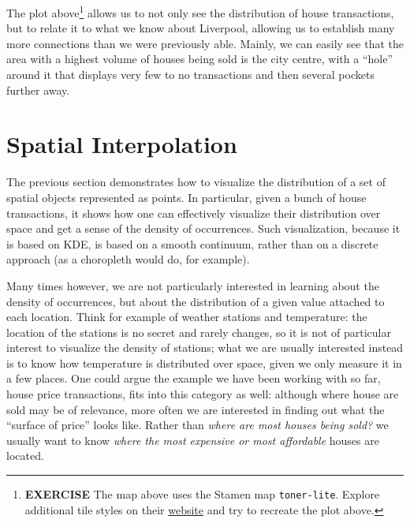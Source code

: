 \documentclass[
]{book}
\begin{document}
The plot above\footnote{\textbf{EXERCISE} The map above uses the Stamen map \texttt{toner-lite}. Explore additional tile styles on their \href{http://maps.stamen.com/\#watercolor/12/37.7706/-122.3782}{website} and try to recreate the plot above.} allows us to not only see the distribution of house transactions, but to relate it to what we know about Liverpool, allowing us to establish many more connections than we were previously able. Mainly, we can easily see that the area with a highest volume of houses being sold is the city centre, with a ``hole'' around it that displays very few to no transactions and then several pockets further away.

\hypertarget{spatial-interpolation}{%
\section{Spatial Interpolation}\label{spatial-interpolation}}

The previous section demonstrates how to visualize the distribution of a set of spatial objects represented as points. In particular, given a bunch of house transactions, it shows how one can effectively visualize their distribution over space and get a sense of the density of occurrences. Such visualization, because it is based on KDE, is based on a smooth continuum, rather than on a discrete approach (as a choropleth would do, for example).

Many times however, we are not particularly interested in learning about the density of occurrences, but about the distribution of a given value attached to each location. Think for example of weather stations and temperature: the location of the stations is no secret and rarely changes, so it is not of particular interest to visualize the density of stations; what we are usually interested instead is to know how temperature is distributed over space, given we only measure it in a few places. One could argue the example we have been working with so far, house price transactions, fits into this category as well: although where house are sold may be of relevance, more often we are interested in finding out what the ``surface of price'' looks like. Rather than \emph{where are most houses being sold?} we usually want to know \emph{where the most expensive or most affordable} houses are located.
\end{document}
